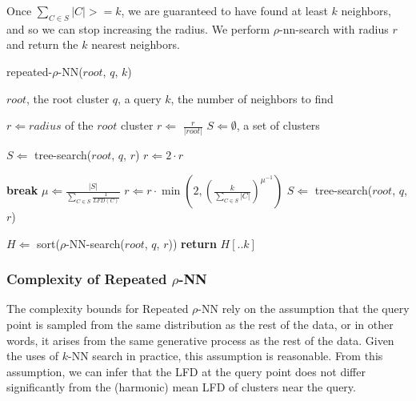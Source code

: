 Once $\sum_{C \in S} |C| >= k$, we are guaranteed to have found at least $k$ neighbors, and so we can stop increasing the radius.
We perform $\rho$-nn-search with radius $r$ and return the $k$ nearest neighbors.

\begin{algorithm} %
    \caption{repeated-$\rho$-NN($root$, $q$, $k$)} %
    \label{alg:knn:repeated-rnn} %
    \begin{algorithmic} %
        \REQUIRE $root$, the root cluster
        \REQUIRE $q$, a query
        \REQUIRE $k$, the number of neighbors to find

        \STATE $r \Leftarrow radius$ of the $root$ cluster
        \STATE $r \Leftarrow$ $\frac{r}{|root|}$
        \STATE $S \Leftarrow \emptyset$, a set of clusters

            \STATE $S \Leftarrow$ tree-search($root$, $q$, $r$)
            \STATE $r \Leftarrow 2 \cdot r$
        \ENDWHILE

        \ALOOP{}
                \STATE \textbf{break}
            \ENDIF
            \STATE $\mu \Leftarrow \frac{|S|}{\sum_{C \in S} \frac{1}{LFD(C)}}$
            \STATE $r \Leftarrow r \cdot \min \left( 2, \left( {\frac{k}{\sum_{C \in S} |C|}} \right)^{\mu^{-1}} \right)$
            \STATE $S \Leftarrow$ tree-search($root$, $q$, $r$)
        \ENDLOOP

        \STATE $H \Leftarrow$ sort($\rho$-NN-search($root$, $q$, $r$))
        \STATE \textbf{return} $H[.. k]$
    \end{algorithmic}
\end{algorithm}


\subsubsection{Complexity of Repeated \texorpdfstring{$\rho$}{p}-NN}
\label{subsubsec:methods:repeated-rnn-complexity}

The complexity bounds for Repeated $\rho$-NN rely on the assumption that the query point is sampled from the same distribution as the rest of the data, or in other words, it arises from the same generative process as the rest of the data.
Given the uses of $k$-NN search in practice, this assumption is reasonable.
From this assumption, we can infer that the LFD at the query point does not differ significantly from the (harmonic) mean LFD of clusters near the query.

